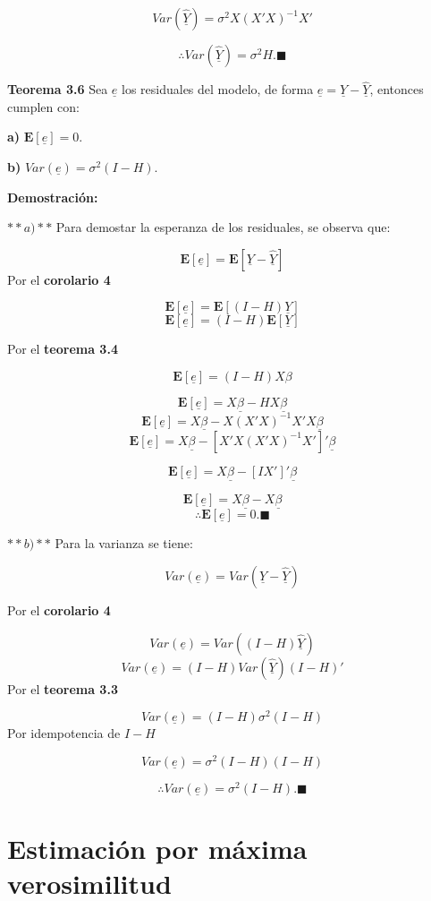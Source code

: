 \documentclass[a4paper,oneside,openany]{book}
\begin{document}
\[Var(\underline{\hat{Y}})=\sigma^2X(X'X)^{-1}X'\]

\[\therefore Var(\underline{\hat{Y}})=\sigma^2H.\blacksquare\]

\textbf{Teorema 3.6} Sea \(\underline{e}\) los residuales del modelo, de
forma \(\underline{e}=\underline{Y}-\underline{\hat{Y}}\), entonces
cumplen con:

\textbf{a)} \(\mathbf{E}[\underline{e}]=0.\)

\textbf{b)} \(Var(\underline{e})=\sigma^2(I-H).\)

\textbf{Demostración:}

\(**a)**\) Para demostar la esperanza de los residuales, se observa que:

\[\mathbf{E}[\underline{e}]=\mathbf{E}[\underline{Y}-\underline{\hat{Y}}]\]
Por el \textbf{corolario 4}

\[\mathbf{E}[\underline{e}]=\mathbf{E}[(I-H)\underline{Y}]\]
\[\mathbf{E}[\underline{e}]=(I-H)\mathbf{E}[\underline{Y}]\]

Por el \textbf{teorema 3.4}

\[\mathbf{E}[\underline{e}]=(I-H)X\beta\]

\[\mathbf{E}[\underline{e}]=X\underline{\beta}-HX\underline{\beta}\]
\[\mathbf{E}[\underline{e}]=X\underline{\beta}-X(X'X)^{-1}X'X\underline{\beta}\]
\[\mathbf{E}[\underline{e}]=X\underline{\beta}-\left[X'X(X'X)^{-1}X'\right]'\underline{\beta}\]

\[\mathbf{E}[\underline{e}]=X\underline{\beta}-[IX']'\underline{\beta}\]

\[\mathbf{E}[\underline{e}]=X\underline{\beta}-X\underline{\beta}\]
\[\therefore \mathbf{E}[\underline{e}]=0. \blacksquare\]

\(**b)**\) Para la varianza se tiene:

\[Var(\underline{e})=Var\left( \underline{Y}-\underline{\hat{Y}}\right)\]

Por el \textbf{corolario 4}

\[Var(\underline{e})=Var\left( (I-H)\underline{\hat{Y}}\right)\]
\[Var(\underline{e})=(I-H)Var(\underline{\hat{Y}})(I-H)'\] Por el
\textbf{teorema 3.3}

\[Var(\underline{e})=(I-H)\sigma^2(I-H)\] Por idempotencia de \(I-H\)

\[Var(\underline{e})=\sigma^2(I-H)(I-H)\]

\[\therefore Var(\underline{e})=\sigma^2(I-H). \blacksquare\]

\section{Estimación por máxima
verosimilitud}\label{estimaciuxf3n-por-muxe1xima-verosimilitud}
\end{document}
